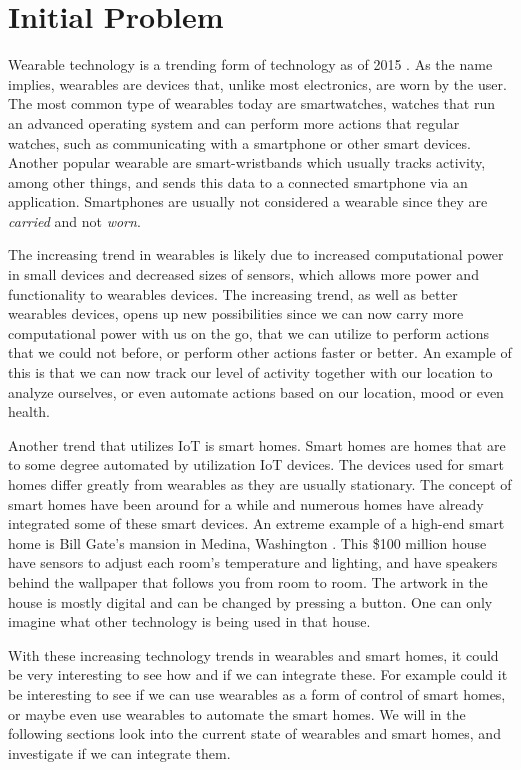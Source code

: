\section{Initial Problem}\label{sec:initproblem}
Wearable technology is a trending form of technology as of 2015 \cite{WEARABLESTREND}. 
As the name implies, wearables are devices that, unlike most electronics, are worn by the user. 
The most common type of wearables today are smartwatches, 
\ie watches that run an advanced operating system and can perform more actions that regular watches, 
such as communicating with a smartphone or other smart devices.
Another popular wearable are smart-wristbands which usually tracks activity, 
among other things, and sends this data to a connected smartphone via an application. 
Smartphones are usually not considered a wearable since they are \emph{carried} and not \emph{worn}. 

The increasing trend in wearables is likely due to increased computational power in small devices and decreased sizes of sensors, 
which allows more power and functionality to wearables devices. 
The increasing trend, as well as better wearables devices, 
opens up new possibilities since we can now carry more computational power with us on the go, 
that we can utilize to perform actions that we could not before, 
or perform other actions faster or better. 
An example of this is that we can now track our level of activity together with our location to analyze ourselves, 
or even automate actions based on our location, mood or even health. 

Another trend that utilizes IoT is smart homes.
Smart homes are homes that are to some degree automated by utilization IoT devices. 
The devices used for smart homes differ greatly from wearables as they are usually stationary. 
The concept of smart homes have been around for a while and numerous homes have already integrated some of these smart devices. 
An extreme example of a high-end smart home is Bill Gate's mansion in Medina, Washington \cite{billgatehouse}.
This \$100 million house have sensors to adjust each room's temperature and lighting, 
and have speakers behind the wallpaper that follows you from room to room. 
The artwork in the house is mostly digital and can be changed by pressing a button. 
One can only imagine what other technology is being used in that house. 

With these increasing technology trends in wearables and smart homes, 
it could be very interesting to see how and if we can integrate these. 
For example could it be interesting to see if we can use wearables as a form of control of smart homes, 
or maybe even use wearables to automate the smart homes.
We will in the following sections look into the current state of wearables and smart homes, 
and investigate if we can integrate them. 
